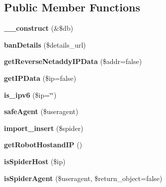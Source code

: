 \subsection*{Public Member Functions}
\begin{DoxyCompactItemize}
\item 
\hypertarget{class_spiders_spiders_handler_aaf2ef772755ec6f361d44e16cc9ffd69}{{\bfseries \-\_\-\-\_\-construct} (\&\$db)}\label{class_spiders_spiders_handler_aaf2ef772755ec6f361d44e16cc9ffd69}

\item 
\hypertarget{class_spiders_spiders_handler_a0ed032c0680ed8786bf32c5c14ae2a55}{{\bfseries ban\-Details} (\$details\-\_\-url)}\label{class_spiders_spiders_handler_a0ed032c0680ed8786bf32c5c14ae2a55}

\item 
\hypertarget{class_spiders_spiders_handler_ad8437521c79f5004a200097e2b1ddb1b}{{\bfseries get\-Reverse\-Netaddy\-I\-P\-Data} (\$addr=false)}\label{class_spiders_spiders_handler_ad8437521c79f5004a200097e2b1ddb1b}

\item 
\hypertarget{class_spiders_spiders_handler_a8830e27fd903837cd05567251c5b8657}{{\bfseries get\-I\-P\-Data} (\$ip=false)}\label{class_spiders_spiders_handler_a8830e27fd903837cd05567251c5b8657}

\item 
\hypertarget{class_spiders_spiders_handler_abc3573e1a83ce17d321fdf53d7941b53}{{\bfseries is\-\_\-ipv6} (\$ip=\char`\"{}\char`\"{})}\label{class_spiders_spiders_handler_abc3573e1a83ce17d321fdf53d7941b53}

\item 
\hypertarget{class_spiders_spiders_handler_a8d10e56d5b0ef0ef60b3c084826f2362}{{\bfseries safe\-Agent} (\$useragent)}\label{class_spiders_spiders_handler_a8d10e56d5b0ef0ef60b3c084826f2362}

\item 
\hypertarget{class_spiders_spiders_handler_a6dd75260e0dc56a749d8fb08f7f7663b}{{\bfseries import\-\_\-insert} (\$spider)}\label{class_spiders_spiders_handler_a6dd75260e0dc56a749d8fb08f7f7663b}

\item 
\hypertarget{class_spiders_spiders_handler_afbbbae383cd1c79cf0dc8565bec18e86}{{\bfseries get\-Robot\-Hostand\-I\-P} ()}\label{class_spiders_spiders_handler_afbbbae383cd1c79cf0dc8565bec18e86}

\item 
\hypertarget{class_spiders_spiders_handler_aa412595f20e526560a3fc7092bee1acd}{{\bfseries is\-Spider\-Host} (\$ip)}\label{class_spiders_spiders_handler_aa412595f20e526560a3fc7092bee1acd}

\item 
\hypertarget{class_spiders_spiders_handler_aa576eb34e93bf91194debad2ff9764c7}{{\bfseries is\-Spider\-Agent} (\$useragent, \$return\-\_\-object=false)}\label{class_spiders_spiders_handler_aa576eb34e93bf91194debad2ff9764c7}

\end{DoxyCompactItemize}


